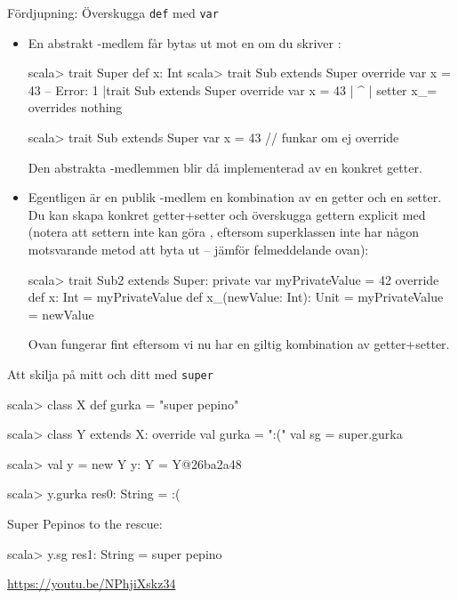 \begin{Slide}{Fördjupning: Överskugga \texttt{def} med \texttt{var}}\SlideFontTiny
\begin{itemize}
\item En abstrakt -medlem får bytas ut mot en  om du  skriver :
\begin{REPLsmall}
scala> trait Super { def x: Int }
scala> trait Sub extends Super { override var x = 43 }
-- Error:
1 |trait Sub extends Super { override var x = 43 }
  |                                             ^
  |                                             setter x_= overrides nothing

scala> trait Sub extends Super { var x = 43 }   // funkar om ej override
\end{REPLsmall}
Den abstrakta -medlemmen blir då implementerad av en konkret getter. 
\item Egentligen är en publik -medlem en kombination av en getter och en setter. Du kan skapa konkret getter+setter och överskugga gettern explicit med  (notera att settern inte kan göra , eftersom superklassen inte har någon motsvarande metod att byta ut -- jämför felmeddelande ovan):
\begin{REPLsmall}
scala> trait Sub2 extends Super:
         private var myPrivateValue = 42
         override def x: Int = myPrivateValue
         def x_(newValue: Int): Unit = myPrivateValue = newValue
\end{REPLsmall}
Ovan fungerar fint eftersom vi nu har en giltig kombination av getter+setter.
\end{itemize}
\end{Slide}


\begin{Slide}{Att skilja på mitt och ditt med \texttt{super}}
\begin{REPL}
scala> class X { def gurka = "super pepino" }

scala> class Y extends X:
         override val gurka = ":("
         val sg = super.gurka

scala> val y = new Y
y: Y = Y@26ba2a48

scala> y.gurka
res0: String = :(
\end{REPL}

\pause
Super Pepinos to the rescue:
\begin{REPLnonum}
scala> y.sg
res1: String = super pepino

\end{REPLnonum}


\pause
{}
\href{https://youtu.be/NPhjiXskz34}{\small https://youtu.be/NPhjiXskz34}
\end{Slide}





